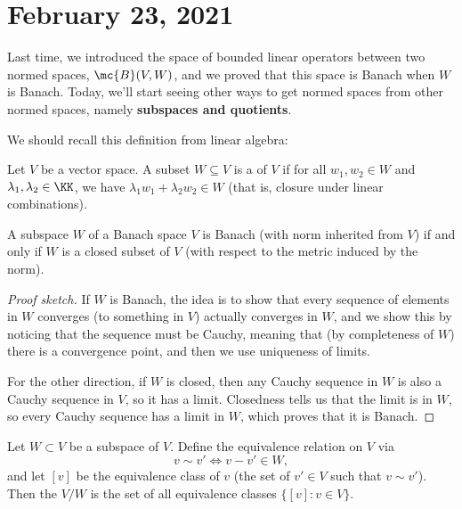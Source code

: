 
\pagebreak\section*{February 23, 2021}

Last time, we introduced the space of bounded linear operators between two normed spaces, $\mc{B}(V, W)$, and we proved that this space is Banach when $W$ is Banach. Today, we'll start seeing other ways to get normed spaces from other normed spaces, namely \textbf{subspaces and quotients}.

We should recall this definition from linear algebra:

\begin{definition}
Let $V$ be a vector space. A subset $W \subseteq V$ is a  of $V$ if for all $w_1, w_2 \in W$ and $\lambda_1, \lambda_2 \in \KK$, we have $\lambda_1 w_1 + \lambda_2 w_2 \in W$ (that is, closure under linear combinations).
\end{definition}

\begin{proposition}
A subspace $W$ of a Banach space $V$ is Banach (with norm inherited from $V$) if and only if $W$ is a closed subset of $V$ (with respect to the metric induced by the norm).
\end{proposition}
\begin{proof}[Proof sketch]
If $W$ is Banach, the idea is to show that every sequence of elements in $W$ converges (to something in $V$) actually converges in $W$, and we show this by noticing that the sequence must be Cauchy, meaning that (by completeness of $W$) there is a convergence point, and then we use uniqueness of limits. 

For the other direction, if $W$ is closed, then any Cauchy sequence in $W$ is also a Cauchy sequence in $V$, so it has a limit. Closedness tells us that the limit is in $W$, so every Cauchy sequence has a limit in $W$, which proves that it is Banach.
\end{proof}

\begin{definition}
Let $W \subset V$ be a subspace of $V$. Define the equivalence relation on $V$ via 
\[
    v \sim v' \iff v - v' \in W,
\]
and let $[v]$ be the equivalence class of $v$ (the set of $v' \in V$ such that $v \sim v'$). Then the  $V/W$ is the set of all equivalence classes $\{[v]: v \in V\}$.
\end{definition}

